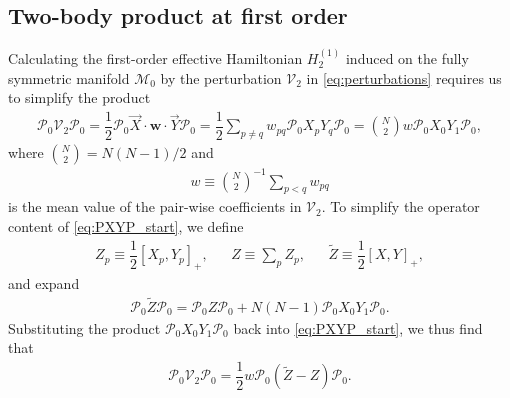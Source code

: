\documentclass[nofootinbib,notitlepage,11pt]{revtex4-2}
\newcommand{\f}[2]{\dfrac{#1}{#2}} %
\newcommand{\p}[1]{\left(#1\right)} %
\renewcommand{\sp}[1]{\left[#1\right]} %
\renewcommand{\c}{\cdot} %
\newcommand{\m}{\bm} %
\renewcommand{\v}{\vec} %
\newcommand{\1}{\mathds{1}}
\newcommand{\M}{\mathcal{M}}
\renewcommand{\P}{\mathcal{P}}
\newcommand{\V}{\mathcal{V}}
\begin{document}
\subsection{Two-body product at first order}
\label{sec:PXYP}

Calculating the first-order effective Hamiltonian $H_2^{(1)}$ induced
on the fully symmetric manifold $\M_0$ by the perturbation $\V_2$ in
\eqref{eq:perturbations} requires us to simplify the product
\begin{align}
  \P_0 \V_2 \P_0
  = \f12 \P_0 \v X\c\m w\c\v Y\P_0
  = \f12 \sum_{p\ne q} w_{pq} \P_0 X_p Y_q \P_0
  = {N\choose 2} w \P_0 X_0 Y_1 \P_0,
  \label{eq:PXYP_start}
\end{align}
where ${N\choose2}=N\p{N-1}/2$ and
\begin{align}
  w \equiv {N\choose 2}^{-1} \sum_{p<q} w_{pq}
\end{align}
is the mean value of the pair-wise coefficients in $\V_2$.  To
simplify the operator content of \eqref{eq:PXYP_start}, we define
\begin{align}
  Z_p \equiv \f12\sp{X_p, Y_p}_+,
  &&
  Z \equiv \sum_p Z_p,
  &&
  \tilde Z \equiv \f12 \sp{X, Y}_+,
\end{align}
and expand
\begin{align}
  \P_0 \tilde Z \P_0 = \P_0 Z \P_0 + N\p{N-1} \P_0 X_0 Y_1 \P_0.
\end{align}
Substituting the product $\P_0 X_0 Y_1 \P_0$ back into
\eqref{eq:PXYP_start}, we thus find that
\begin{align}
  \P_0 \V_2 \P_0
  = \f12 w \P_0 \p{\tilde Z -  Z } \P_0.
\end{align}


\end{document}
